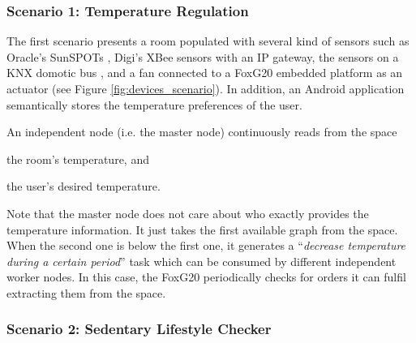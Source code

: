 
\subsubsection{Scenario 1: Temperature Regulation}

The first scenario presents a room populated with several kind of sensors such as Oracle's SunSPOTs ,
Digi's XBee sensors with an IP gateway,
the sensors on a KNX domotic bus , and a fan connected to a FoxG20  embedded platform as an actuator (see Figure \ref{fig:devices_scenario}).
In addition, an Android application  semantically stores the temperature preferences of the user.




An independent node (i.e. the master node) continuously reads from the space %
\begin{enumerate*}[label=\itshape(\arabic*\upshape)]
  \item the room's temperature, and
  \item the user's desired temperature.
\end{enumerate*}
Note that the master node does not care about who exactly provides the temperature information.
It just takes the first available graph from the space.
When the second one is below the first one, it generates a ``\emph{decrease temperature during a certain period}'' task which can be consumed by different independent worker nodes.
In this case, the FoxG20 periodically checks for orders it can fulfil extracting them from the space. %



\subsubsection{Scenario 2: Sedentary Lifestyle Checker}

